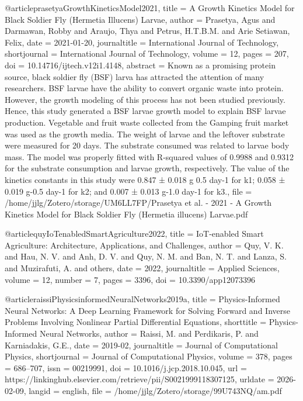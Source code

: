 {{{{@article{prasetyaGrowthKineticsModel2021,
  title = {A {{Growth Kinetics Model}} for {{Black Soldier Fly}} ({{Hermetia}} Illucens) {{Larvae}}},
  author = {Prasetya, Agus and Darmawan, Robby and Araujo, Thya and Petrus, H.T.B.M. and Arie Setiawan, Felix},
  date = {2021-01-20},
  journaltitle = {International Journal of Technology},
  shortjournal = {International Journal of Technology},
  volume = {12},
  pages = {207},
  doi = {10.14716/ijtech.v12i1.4148},
  abstract = {Known as a promising protein source, black soldier fly (BSF) larva has attracted the attention of many researchers. BSF larvae have the ability to convert organic waste into protein. However, the growth modeling of this process has not been studied previously. Hence, this study generated a BSF larvae growth model to explain BSF larvae production. Vegetable and fruit waste collected from the Gamping fruit market was used as the growth media. The weight of larvae and the leftover substrate were measured for 20 days. The substrate consumed was related to larvae body mass. The model was properly fitted with R-squared values of 0.9988 and 0.9312 for the substrate consumption and larvae growth, respectively. The value of the kinetics constants in this study were 0.847 ± 0.018 g 0.5 day-1 for k1; 0.058 ± 0.019 g-0.5 day-1 for k2; and 0.007 ± 0.013 g-1.0 day-1 for k3­.},
  file = {/home/jjlg/Zotero/storage/UM6LL7FP/Prasetya et al. - 2021 - A Growth Kinetics Model for Black Soldier Fly (Hermetia illucens) Larvae.pdf}
}

@article{quyIoTenabledSmartAgriculture2022,
  title = {{{IoT-enabled}} Smart Agriculture: Architecture, Applications, and Challenges},
  author = {Quy, V. K. and Hau, N. V. and Anh, D. V. and Quy, N. M. and Ban, N. T. and Lanza, S. and Muzirafuti, A. and others},
  date = {2022},
  journaltitle = {Applied Sciences},
  volume = {12},
  number = {7},
  pages = {3396},
  doi = {10.3390/app12073396}
}

@article{raissiPhysicsinformedNeuralNetworks2019a,
  title = {Physics-Informed Neural Networks: {{A}} Deep Learning Framework for Solving Forward and Inverse Problems Involving Nonlinear Partial Differential Equations},
  shorttitle = {Physics-Informed Neural Networks},
  author = {Raissi, M. and Perdikaris, P. and Karniadakis, G.E.},
  date = {2019-02},
  journaltitle = {Journal of Computational Physics},
  shortjournal = {Journal of Computational Physics},
  volume = {378},
  pages = {686--707},
  issn = {00219991},
  doi = {10.1016/j.jcp.2018.10.045},
  url = {https://linkinghub.elsevier.com/retrieve/pii/S0021999118307125},
  urldate = {2026-02-09},
  langid = {english},
  file = {/home/jjlg/Zotero/storage/99U743NQ/am.pdf}
}

}}}}
